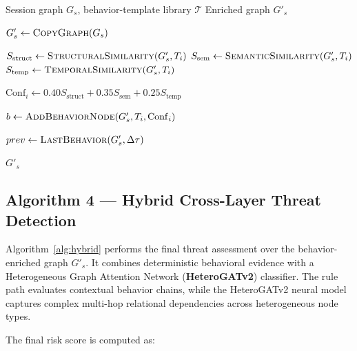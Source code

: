 \documentclass[conference]{IEEEtran}
\begin{document}
\begin{algorithm}[t]
\caption{Semantic Behavior Abstraction and Temporal Chaining}
\label{alg:behavior}
\small
\begin{algorithmic}[1]
\Require Session graph $G_s$, behavior-template library $\mathcal{T}$
\Ensure Enriched graph $G'_s$

    \State $G'_s \gets \Call{CopyGraph}{G_s}$

        \State $S_{\mathrm{struct}}
        \gets \Call{StructuralSimilarity}{G'_s,T_i}$
        \State $S_{\mathrm{sem}}
        \gets \Call{SemanticSimilarity}{G'_s,T_i}$
        \State $S_{\mathrm{temp}}
        \gets \Call{TemporalSimilarity}{G'_s,T_i}$

        \State $\mathrm{Conf}_i
        \gets
        0.40S_{\mathrm{struct}}
        +0.35S_{\mathrm{sem}}
        +0.25S_{\mathrm{temp}}$

            \State $b\gets
            \Call{AddBehaviorNode}{G'_s,T_i,\mathrm{Conf}_i}$
                \State {}
            \EndFor

            \State $prev\gets
            \Call{LastBehavior}{G'_s,\Delta\tau}$
                \State {}
            \EndIf
        \EndIf
    \EndFor

    \State \Return $G'_s$
\EndProcedure
\end{algorithmic}
\end{algorithm}

\subsection{Algorithm 4 --- Hybrid Cross-Layer Threat Detection}
\label{subsec:hybrid}

Algorithm~\ref{alg:hybrid} performs the final threat assessment over the behavior-enriched graph $G'_s$. It combines deterministic behavioral evidence with a Heterogeneous Graph Attention Network (\textbf{HeteroGATv2}) classifier. The rule path evaluates contextual behavior chains, while the HeteroGATv2 neural model captures complex multi-hop relational dependencies across heterogeneous node types.

The final risk score is computed as:
\end{document}
